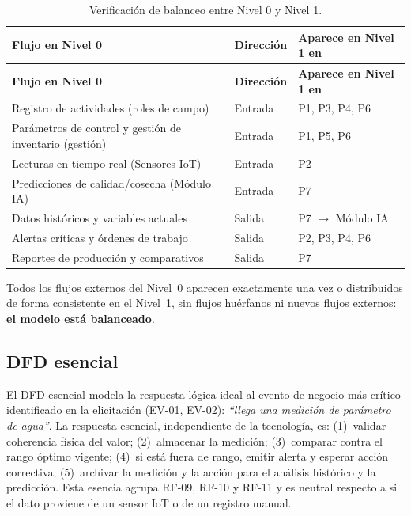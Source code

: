 \documentclass[11pt,a4paper]{article}
\renewcommand{\_}{\textunderscore\allowbreak}
\begin{document}
\begin{longtable}{|p{6.1cm}|p{3.0cm}|p{4.2cm}|}
\caption{Verificación de balanceo entre Nivel 0 y Nivel 1.}
\label{tab:balanceo}\\
\hline
\textbf{Flujo en Nivel 0} & \textbf{Dirección} & \textbf{Aparece en Nivel 1 en}\\
\hline
\endfirsthead

\hline
\textbf{Flujo en Nivel 0} & \textbf{Dirección} & \textbf{Aparece en Nivel 1 en}\\
\hline
\endhead

\hline
\endfoot

\hline
\endlastfoot

Registro de actividades (roles de campo) & Entrada & P1, P3, P4, P6\\
\hline
Parámetros de control y gestión de inventario (gestión) & Entrada & P1, P5, P6\\
\hline
Lecturas en tiempo real (Sensores IoT) & Entrada & P2\\
\hline
Predicciones de calidad/cosecha (Módulo IA) & Entrada & P7\\
\hline
Datos históricos y variables actuales & Salida & P7 $\rightarrow$ Módulo IA\\
\hline
Alertas críticas y órdenes de trabajo & Salida & P2, P3, P4, P6\\
\hline
Reportes de producción y comparativos & Salida & P7\\

\end{longtable}

\noindent Todos los flujos externos del Nivel~0 aparecen exactamente una vez o distribuidos de forma consistente en el Nivel~1, sin flujos huérfanos ni nuevos flujos externos: \textbf{el modelo está balanceado}.

\subsection{DFD esencial}
El DFD esencial modela la respuesta lógica ideal al evento de negocio más crítico identificado en la elicitación (EV-01, EV-02): \textit{``llega una medición de parámetro de agua''}. La respuesta esencial, independiente de la tecnología, es: (1)~validar coherencia física del valor; (2)~almacenar la medición; (3)~comparar contra el rango óptimo vigente; (4)~si está fuera de rango, emitir alerta y esperar acción correctiva; (5)~archivar la medición y la acción para el análisis histórico y la predicción. Esta esencia agrupa RF-09, RF-10 y RF-11 y es neutral respecto a si el dato proviene de un sensor IoT o de un registro manual.
\end{document}
